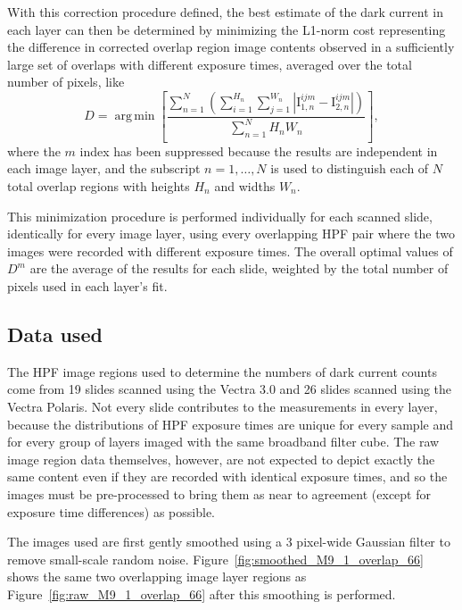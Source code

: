 \documentclass[letterpaper,11pt]{article}
\newcommand{\reffig}[1]{Figure~\ref{#1}}
\DeclareMathOperator*{\argmin}{arg\,min}
\newcommand{\Iota}{\mathrm{I}}
\begin{document}
With this correction procedure defined, the best estimate of the dark current in each layer can then be determined by minimizing the L1-norm cost representing the difference in corrected overlap region image contents observed in a sufficiently large set of overlaps with different exposure times, averaged over the total number of pixels, like
\begin{equation}
D = \argmin{ \left[ \frac{ \sum_{n=1}^{N} \left( \sum_{i=1}^{H_{n}} \sum_{j=1}^{W_{n}} \left| \Iota^{ijm}_{1,n} - \Iota^{ijm}_{2,n} \right| \right) }{ \sum_{n=1}^{N} H_{n}W_{n}} \right] },
\label{eq:minimization_def}
\end{equation} 
where the $m$ index has been suppressed because the results are independent in each image layer, and the subscript $n=1,\ldots,N$ is used to distinguish each of $N$ total overlap regions with heights $H_{n}$ and widths $W_{n}$. 

This minimization procedure is performed individually for each scanned slide, identically for every image layer, using every overlapping HPF pair where the two images were recorded with different exposure times. The overall optimal values of $D^{m}$ are the average of the results for each slide, weighted by the total number of pixels used in each layer's fit.  

\subsection{Data used}
\label{ssec:data_used}

The HPF image regions used to determine the numbers of dark current counts come from 19 slides scanned using the Vectra 3.0 and 26 slides scanned using the Vectra Polaris. Not every slide contributes to the measurements in every layer, because the distributions of HPF exposure times are unique for every sample and for every group of layers imaged with the same broadband filter cube. The raw image region data themselves, however, are not expected to depict exactly the same content even if they are recorded with identical exposure times, and so the images must be pre-processed to bring them as near to agreement (except for exposure time differences) as possible. 

The images used are first gently smoothed using a 3 pixel-wide Gaussian filter to remove small-scale random noise. \reffig{fig:smoothed_M9_1_overlap_66} shows the same two overlapping image layer regions as \reffig{fig:raw_M9_1_overlap_66} after this smoothing is performed.
\end{document}
